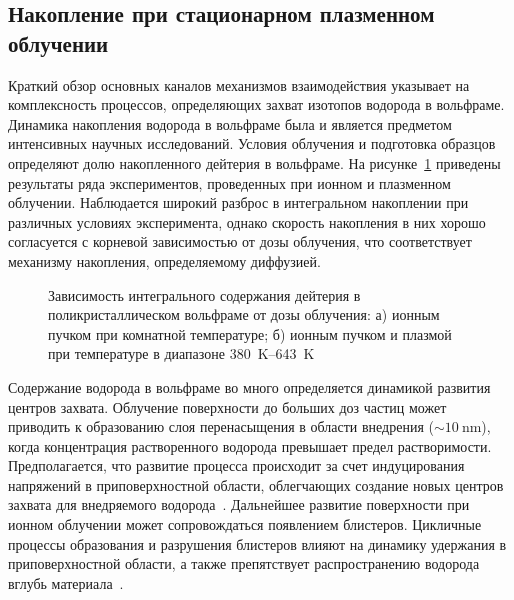 \subsection{Накопление при стационарном плазменном облучении}

Краткий обзор основных каналов механизмов взаимодействия указывает на комплексность процессов, определяющих захват изотопов водорода в вольфраме. Динамика накопления водорода в вольфраме была и является предметом интенсивных научных исследований. Условия облучения и подготовка образцов определяют долю накопленного дейтерия в вольфраме. На рисунке~\cref{fig:ch1/retention_fluence} приведены результаты ряда экспериментов, проведенных при ионном и плазменном облучении. Наблюдается широкий разброс в интегральном накоплении при различных условиях эксперимента, однако скорость накопления в них хорошо согласуется с корневой зависимостью от дозы облучения, что соответствует механизму накопления, определяемому диффузией.  

\begin{figure}[ht]
    \caption{Зависимость интегрального содержания дейтерия в поликристаллическом вольфраме от дозы облучения: а) ионным пучком при комнатной температуре; б) ионным пучком и плазмой при температуре в диапазоне \SIrange{380}{643}{\kelvin}~\cite{HarutunyanThesis}}\label{fig:ch1/retention_fluence}
\end{figure}

Содержание водорода в вольфраме во много определяется динамикой развития центров захвата. Облучение поверхности до больших доз частиц может приводить к образованию слоя перенасыщения в области внедрения (\( \sim \SI{10}{\nano\meter} \)), когда концентрация растворенного водорода превышает предел растворимости. Предполагается, что развитие процесса происходит за счет индуцирования напряжений в приповерхностной области, облегчающих создание новых центров захвата для внедряемого водорода~\cite{Nishijima2023}. Дальнейшее развитие поверхности при ионном облучении может сопровождаться появлением блистеров. Цикличные процессы образования и разрушения блистеров влияют на динамику удержания в приповерхностной области, а также препятствует распространению водорода вглубь материала~\cite{Bauer2017}.  

